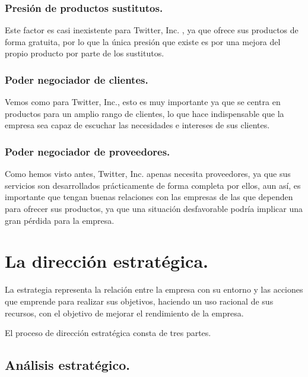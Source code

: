 \subsubsection{Presión de productos sustitutos.}

Este factor es casi inexistente para Twitter, Inc. , ya que ofrece sus productos de forma gratuita, por lo que la única presión que existe es por una mejora del propio producto por parte de los sustitutos.

\subsubsection{Poder negociador de clientes.}

Vemos como para Twitter, Inc., esto es muy importante ya que se centra en productos para un amplio rango de clientes, lo que hace indispensable que la empresa sea capaz de escuchar las necesidades e intereses de sus clientes.

\subsubsection{Poder negociador de proveedores.}

Como hemos visto antes, Twitter, Inc. apenas necesita proveedores, ya que sus servicios son desarrollados prácticamente de forma completa por ellos, aun así, es importante que tengan buenas relaciones con las empresas de las que dependen para ofrecer sus productos, ya que una situación desfavorable podría implicar una gran pérdida para la empresa.








\section{La dirección estratégica.}

La estrategia representa la relación entre la empresa con su entorno y las acciones que emprende para realizar sus objetivos, haciendo un uso racional de sus recursos, con el objetivo de mejorar el rendimiento de la empresa.

El proceso de dirección estratégica consta de tres partes.

\subsection{Análisis estratégico.}

